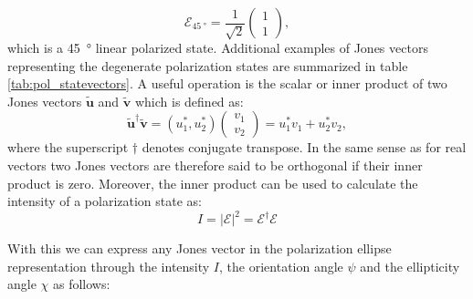 \begin{equation}
    \bm{\mathcal{E}}_{\SI{45}{\degree}}= \frac{1}{\sqrt{2}}
    \begin{pmatrix}
    1 \\
    1
    \end{pmatrix},
\end{equation}
which is a \SI{45}{\degree} linear polarized state. Additional examples of Jones vectors representing the degenerate polarization states are summarized in table \ref{tab:pol_statevectors}. A useful operation is the scalar or inner product of two Jones vectors $\bm{\tilde{u}}$ and $\bm{\tilde{v}}$ which is defined as:
\begin{equation}
    \bm{\tilde{u}}^{\dagger}\bm{\tilde{v}} = \left(u_1^{*}, u_2^{*} \right)
    \begin{pmatrix}
    v_1 \\
    v_2
    \end{pmatrix}
    = u_1^{*}v_1 + u_2^{*}v_2,
\end{equation}
where the superscript $\dagger$ denotes conjugate transpose. In the same sense as for real vectors two Jones vectors are therefore said to be orthogonal if their inner product is zero. Moreover, the inner product can be used to calculate the intensity of a polarization state as:
\begin{equation}
    I=|\bm{\mathcal{E}}|^2=\bm{\mathcal{E}}^{\dagger}\bm{\mathcal{E}}
\end{equation}

With this we can express any Jones vector in the polarization ellipse representation through the intensity $I$, the orientation angle $\psi$ and the ellipticity angle $\chi$ as follows:

